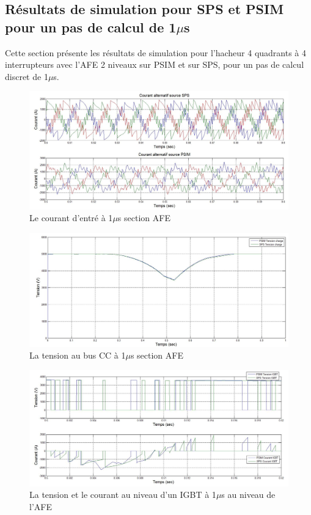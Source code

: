 \subsection{Résultats de simulation pour SPS et PSIM pour un pas de calcul de 1$\mu$s}
Cette section présente les résultats de simulation pour l'hacheur 4 quadrants à 4 interrupteurs avec l'AFE 2 niveaux sur PSIM et sur SPS, pour un pas de calcul discret de 1$\mu$s. 


\begin{figure}[htb]
\centering
\includegraphics[scale=0.5]{fig/Hach_AFE/1u/cour_al.jpg}
\caption{Le courant d'entré à 1$\mu$s section AFE}
\label{AF_HA_cou1}
\end{figure}


\begin{figure}[htb]
\centering
\includegraphics[scale=0.5]{fig/Hach_AFE/1u/ten_bus.jpg}
\caption{La tension au bus CC à 1$\mu$s section AFE}
\label{AF_HA_vch1}
\end{figure}



\begin{figure}[htb]
\centering
\includegraphics[scale=0.5]{fig/Hach_AFE/1u/IGBT_AFE.jpg}
\caption{La tension et le courant au niveau d'un IGBT à 1$\mu$s au niveau de l'AFE}
\label{AF_HA_IGBT1}
\end{figure}


